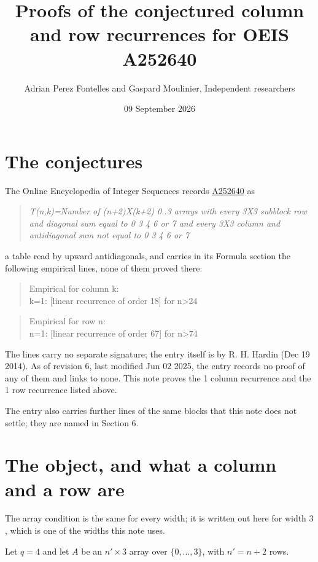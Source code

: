 \documentclass[11pt]{article}
\title{Proofs of the conjectured column and row recurrences for OEIS A252640}
\author{Adrian Perez Fontelles and Gaspard Moulinier, Independent researchers}
\date{09 September 2026}
\theoremstyle{definition}
\begin{document}
\maketitle
\section{The conjectures}

The Online Encyclopedia of Integer Sequences records \href{https://oeis.org/A252640}{A252640} as

\begin{quote}\itshape T(n,k)=Number of (n+2)X(k+2) 0..3 arrays with every 3X3 subblock row and diagonal sum equal to 0 3 4 6 or 7 and every 3X3 column and antidiagonal sum not equal to 0 3 4 6 or 7\end{quote}

a table read by upward antidiagonals, and carries in its Formula section the following empirical lines, none of them proved there:

\begin{quote}\ttfamily Empirical for column k:\\
k=1: [linear recurrence of order 18] for n>24\end{quote}

\begin{quote}\ttfamily Empirical for row n:\\
n=1: [linear recurrence of order 67] for n>74\end{quote}

The lines carry no separate signature; the entry itself is by R. H. Hardin (Dec 19 2014). As of revision 6, last modified Jun 02 2025, the entry records no proof of any of them and links to none. This note proves the 1 column recurrence and the 1 row recurrence listed above.

The entry also carries further lines of the same blocks that this note does not settle; they are named in Section 6.

\section{The object, and what a column and a row are}

The array condition is the same for every width; it is written out here for width $3$, which is one of the widths this note uses.

Let $q = 4$ and let $A$ be an $n' \times 3$ array over $\{0,\dots,3\}$, with $n' = n + 2$ rows.
\end{document}
